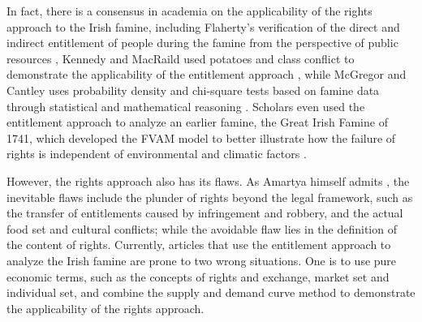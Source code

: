 In fact, there is a consensus in academia on the applicability of the rights approach to the Irish famine, including Flaherty's verification of the direct and indirect entitlement of  people during the famine from the perspective of public resources \citep{flaherty2021common}, Kennedy and MacRaild used potatoes and class conflict to demonstrate the applicability of the entitlement approach \citep{kennedy2022perspectives}, while McGregor and Cantley uses probability density and chi-square tests based on famine data through statistical and mathematical reasoning \citep{mcgregor1992test}. Scholars even used the entitlement approach to analyze an earlier famine, the Great Irish Famine of 1741, which developed the FVAM model to better illustrate how the failure of rights is independent of environmental and climatic factors \citep{engler2013irish}.

However, the rights approach also has its flaws. As Amartya himself admits \citep{sen1982poverty}, the inevitable flaws include the plunder of rights beyond the legal framework, such as the transfer of entitlements caused by infringement and robbery, and the actual food set and cultural conflicts; while the avoidable flaw lies in the definition of the content of rights. Currently, articles that use the entitlement approach to analyze the Irish famine are prone to two wrong situations. One is to use pure economic terms, such as the concepts of rights and exchange, market set and individual set, and combine the supply and demand curve method to demonstrate the applicability of the rights approach.



